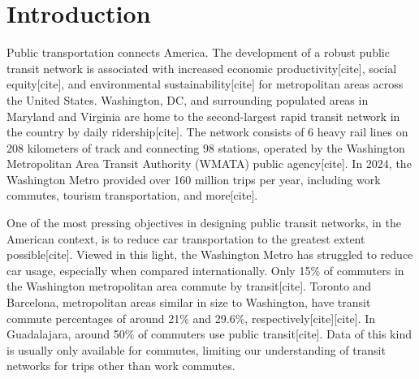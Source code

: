 \documentclass[manuscript,screen,review]{acmart}
\begin{document}
\maketitle

\section{Introduction}

Public transportation connects America. The development of a robust public transit network is associated with increased economic productivity[cite], social equity[cite], and environmental sustainability[cite] for metropolitan areas across the United States. Washington, DC, and surrounding populated areas in Maryland and Virginia are home to the second-largest rapid transit network in the country by daily ridership[cite]. The network consists of 6 heavy rail lines on 208 kilometers of track and connecting 98 stations, operated by the Washington Metropolitan Area Transit Authority (WMATA) public agency[cite]. In 2024, the Washington Metro provided over 160 million trips per year, including work commutes, tourism transportation, and more[cite]. 

One of the most pressing objectives in designing public transit networks, in the American context, is to reduce car transportation to the greatest extent possible[cite]. Viewed in this light, the Washington Metro has struggled to reduce car usage, especially when compared internationally. Only 15\% of commuters in the Washington metropolitan area commute by transit[cite]. Toronto and Barcelona, metropolitan areas similar in size to Washington, have transit commute percentages of around 21\% and 29.6\%, respectively[cite][cite]. In Guadalajara, around 50\% of commuters use public transit[cite]. Data of this kind is usually only available for commutes, limiting our understanding of transit networks for trips other than work commutes.
\end{document}
